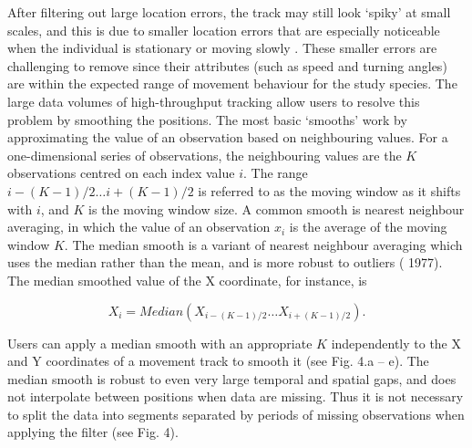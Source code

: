 \begin{refsection}
    After filtering out large location errors, the track may still look `spiky’ at small scales, and this is due to smaller location errors that are especially noticeable when the individual is stationary or moving slowly \citep{noonan2019}.
    These smaller errors are challenging to remove since their attributes (such as speed and turning angles) are within the expected range of movement behaviour for the study species. 
    The large data volumes of high-throughput tracking allow users to resolve this problem by smoothing the positions. 
    The most basic `smooths’ work by approximating the value of an observation based on neighbouring values.
    For a one-dimensional series of observations, the neighbouring values are the $K$ observations centred on each index value $i$.
    The range $ {i - (K-1)/2} \ldots {i + (K-1)/2} $ is referred to as the moving window as it shifts with $i$, and $K$ is the moving window size.
    A common smooth is nearest neighbour averaging, in which the value of an observation $x_i$ is the average of the moving window $K$.
    The median smooth is a variant of nearest neighbour averaging which uses the median rather than the mean, and is more robust to outliers (\citeauthor{tukey1977} 1977).
    The median smoothed value of the X coordinate, for instance, is
    \begin{linenomath*}
        \begin{equation*}
            X_i = Median(X_{i - (K-1)/2} \ldots X_{i + (K-1)/2}).
        \end{equation*}
    \end{linenomath*}
    Users can apply a median smooth with an appropriate $K$ independently to the X and Y coordinates of a movement track to smooth it (see Fig. 4.a -- e).
    The median smooth is robust to even very large temporal and spatial gaps, and does not interpolate between positions when data are missing. 
    Thus it is not necessary to split the data into segments separated by periods of missing observations when applying the filter (see Fig. 4).


\end{refsection}
